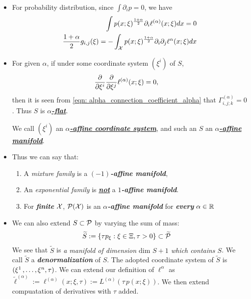\documentclass[11pt]{article}
\begin{document}
\begin{itemize}
\item \begin{remark}
For probability distribution, since $\int \partial_i p = 0$, we have
\begin{align*}
\int p(x; \xi)^{\frac{1+\alpha}{2}} \partial_i \ell^{(\alpha)}(x; \xi) dx = 0\\
\frac{1+ \alpha}{2}g_{i,j}(\xi) = -\int_{{\mathcal X}}p(x; \xi)^{\frac{1+\alpha}{2}}\partial_i \partial_j \ell^{\alpha}(x; \xi) dx
\end{align*}
\end{remark}

\item \begin{definition}
For given $\alpha$, if under some coordinate system $(\xi^i)$ of $S$, 
\begin{align}
\frac{\partial }{ \partial \xi^i}\frac{\partial }{ \partial \xi^j}\ell^{(\alpha)}(x; \xi) &= 0, \label{eqn: alpha_affine}
\end{align} then it is seen from \eqref{eqn: alpha_connection_coefficient_alpha} that $\Gamma^{(\alpha)}_{i,j;k} = 0$. Thus $S$ is \underline{\emph{\textbf{$\alpha$-flat}}}. 

We call $(\xi^i)$ an \underline{\emph{\textbf{$\alpha$-affine coordinate system}}}, and such an $S$ an \underline{\emph{\textbf{$\alpha$-affine manifold}}}.
\end{definition}

\item \begin{remark} Thus we can say that:
\begin{enumerate}
\item A \emph{mixture family} is a \emph{\textbf{$(-1)$-affine manifold}}, 
\item An \emph{exponential family} is \underline{\textbf{\emph{not}}} a \textit{\textbf{$1$-affine manifold}}.
\item For \emph{\textbf{finite}} ${\mathcal X}$, ${\mathcal P}({\mathcal X})$ is an \textbf{\emph{$\alpha$-affine manifold}} for \emph{\textbf{every}} $\alpha \in {\mathbb R}$
\end{enumerate}
\end{remark}


\item \begin{definition}
We can also extend $S \subset {\mathcal P}$ by varying the sum of mass:
\begin{align*}
\widetilde{S} &:= \left\{\tau p_{\xi}:  \xi \in \Xi, \tau >0 \right\} \subset \widetilde{{\mathcal P}} 
\end{align*} We see that $\widetilde{S}$ is \emph{a manifold  of dimension $\text{dim }S + 1$ which contains $S$}. We call $\widetilde{S}$ a \emph{\textbf{denormalization}} of $S$. The adopted coordinate system of $\widetilde{S}$ is $(\xi^1 \,{,}\ldots{,}\, \xi^n, \tau)$. We can extend our definition of $\ell^{\alpha}$ as $\widetilde{\ell}^{(\alpha)} := \ell^{(\alpha)}(x; \xi, \tau) :=  L^{(\alpha)}(\tau\, p(x; \xi))$. We then extend compuatation of derivatives with $\tau$ added.
\end{definition}


\end{itemize}
\end{document}
